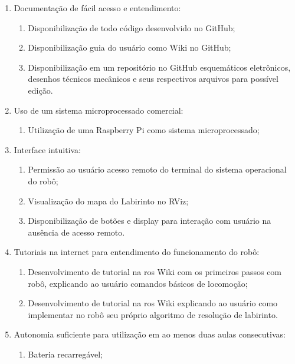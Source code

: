 \begin{enumerate}
	\item Documentação de fácil acesso e entendimento:
	\begin{enumerate}
		\item Disponibilização de todo código desenvolvido no GitHub;
		
		\item Disponibilização guia do usuário como Wiki no GitHub;
		
		\item Disponibilização em um repositório no GitHub esquemáticos eletrônicos, desenhos técnicos mecânicos e seus respectivos arquivos para possível edição.
	\end{enumerate}
	
	\item Uso de um sistema microprocessado comercial:
	\begin{enumerate}
		\item Utilização de uma Raspberry Pi como sistema microprocessado;
	\end{enumerate}
	
	\item Interface intuitiva:
	\begin{enumerate}
		\item Permissão ao usuário acesso remoto do terminal do sistema operacional do robô;
		
		\item Visualização do mapa do Labirinto no RViz;
		
		\item Disponibilização de botões e display para interação com usuário na ausência de acesso remoto.
		
	\end{enumerate}
	
	\item Tutoriais na internet para entendimento do funcionamento do robô:
	\begin{enumerate}
		\item Desenvolvimento de tutorial na \gls*{ros} Wiki com os primeiros passos com robô, explicando ao usuário comandos básicos de locomoção;
		
		\item Desenvolvimento de tutorial na \gls*{ros} Wiki explicando ao usuário como implementar no robô seu próprio algoritmo de resolução de labirinto.
	\end{enumerate}
	
	\item Autonomia suficiente para utilização em ao menos duas aulas consecutivas:
	\begin{enumerate}
		\item Bateria recarregável;
		

\end{enumerate}
\end{enumerate}
